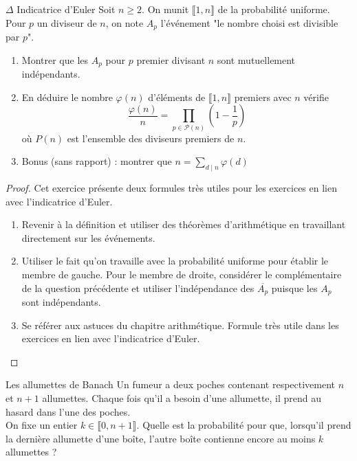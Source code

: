 \documentclass[french,a4paper]{article}
\theoremstyle{plain}
\theoremstyle{definition}
\theoremstyle{remark}
\begin{document}
\begin{ex}{$\Delta$ Indicatrice d'Euler}
	Soit $n\geqslant 2$. On munit $\llbracket 1,n\rrbracket$ de la probabilité uniforme. Pour $p$ un diviseur de $n$, on note $A_p$ l'événement "le nombre choisi est divisible par $p$".
	\begin{enumerate}
		\item Montrer que les $A_p$ pour $p$ premier divisant $n$ sont mutuellement indépendants.
		\item En déduire le nombre $\varphi(n)$ d'éléments de $\llbracket1,n\rrbracket$ premiers avec $n$ vérifie $$\frac{\varphi(n)}{n}=\prod_{p\in\mathcal{P}(n)}\left(1-\frac{1}{p}\right)$$ où $P(n)$ est l'ensemble des diviseurs premiers de $n$.
		\item Bonus (sans rapport) : montrer que $n=\displaystyle\sum_{d\mid n}\varphi(d)$
	\end{enumerate}
\end{ex}
\begin{proof}
	Cet exercice présente deux formules très utiles pour les exercices en lien avec l'indicatrice d'Euler.
	\begin{enumerate}
		\item Revenir à la définition et utiliser des théorèmes d'arithmétique en travaillant directement sur les événements.
		\item Utiliser le fait qu'on travaille avec la probabilité uniforme pour établir le membre de gauche. Pour le membre de droite, considérer le complémentaire de la question précédente et utiliser l'indépendance des $\overline{A_p}$ puisque les $A_p$ sont indépendants.
		\item Se référer aux astuces du chapitre arithmétique. Formule très utile dans les exercices en lien avec l'indicatrice d'Euler.
	\end{enumerate}
\end{proof}

\begin{ex}{Les allumettes de Banach}
	Un fumeur a deux poches contenant respectivement $n$ et $n+1$ allumettes. Chaque fois qu'il a besoin d'une allumette, il prend au hasard dans l'une des poches.\\ On fixe un entier $k\in\llbracket0,n+1\rrbracket$. Quelle est la probabilité pour que, lorsqu'il prend la dernière allumette d'une boîte, l'autre boîte contienne encore au moins $k$ allumettes ?
\end{ex}
\end{document}
